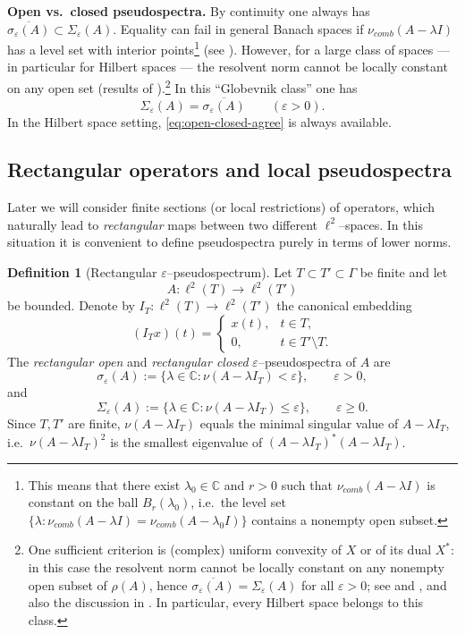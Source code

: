 \documentclass[11pt]{article}
\theoremstyle{definition}
\newtheorem{definition}[theorem]{Definition}
\newcommand{\C}{\mathbb{C}}
\begin{document}
\noindent
\textbf{Open vs.\ closed pseudospectra.}
By continuity one always has $\overline{\sigma_\varepsilon(A)}\subset
\Sigma_\varepsilon(A)$. Equality can fail in general Banach spaces if
$\nu_{comb}(A-\lambda I)$ has a level set with interior points\footnote{This means that there exist $\lambda_0\in\C$ and $r>0$ such that
$\nu_{comb}(A-\lambda I)$ is constant on the ball $B_r(\lambda_0)$, i.e.\ the level set
$\{\lambda:\nu_{comb}(A-\lambda I)=\nu_{comb}(A-\lambda_0 I)\}$ contains a nonempty open subset.} (see
\cite{Shargorodsky2008}). However, for a large class of spaces --- in
particular for Hilbert spaces --- the resolvent norm cannot be locally constant
on any open set (results of \cite{Globevnik1976,Shargorodsky2008}).\footnote{One sufficient criterion is (complex) uniform convexity of $X$ or of
its dual $X^*$: in this case the resolvent norm cannot be locally constant on
any nonempty open subset of $\rho(A)$, hence
$\overline{\sigma_\varepsilon(A)}=\Sigma_\varepsilon(A)$ for all $\varepsilon>0$;
see \cite{Globevnik1976} and \cite{Shargorodsky2008}, and also the discussion in
\cite{DaviesShargorodsky2015}. In particular, every Hilbert space belongs to
this class.}
In this ``Globevnik class'' one has
\begin{equation}\label{eq:open-closed-agree}
  \Sigma_\varepsilon(A)=\overline{\sigma_\varepsilon(A)}\qquad(\varepsilon>0).
\end{equation}
In the Hilbert space setting, \eqref{eq:open-closed-agree} is always available.
\subsection{Rectangular operators and local pseudospectra}
\label{sec:rectangular-pseudo}
Later we will consider finite sections (or local restrictions) of operators,
which naturally lead to \emph{rectangular} maps between two different
$\ell^2$--spaces. In this situation it is convenient to define pseudospectra
purely in terms of lower norms.

\begin{definition}[Rectangular $\varepsilon$--pseudospectrum]\label{def:rectangular-pseudo}
Let $T\subset T'\subset\Gamma$ be finite and let
\[
  A:\ell^2(T)\longrightarrow \ell^2(T')
\]
be bounded. Denote by $I_T:\ell^2(T)\to\ell^2(T')$ the canonical embedding
\[
  (I_T x)(t) =
  \begin{cases}
    x(t), & t\in T,\\
    0,    & t\in T'\setminus T.
  \end{cases}
\]
The \emph{rectangular open} and \emph{rectangular closed} $\varepsilon$--pseudospectra of $A$ are
\[
  \sigma_\varepsilon(A)
  := \{\lambda\in\C : \nu(A-\lambda I_T) < \varepsilon\},
  \qquad \varepsilon>0,
\]
and
\[
  \Sigma_\varepsilon(A)
  := \{\lambda\in\C : \nu(A-\lambda I_T) \le \varepsilon\},
  \qquad \varepsilon\ge 0.
\]
Since $T,T'$ are finite, $\nu(A-\lambda I_T)$ equals the minimal singular value of $A-\lambda I_T$,
i.e.\ $\nu(A-\lambda I_T)^2$ is the smallest eigenvalue of $(A-\lambda I_T)^*(A-\lambda I_T)$.
\end{definition}
\end{document}
